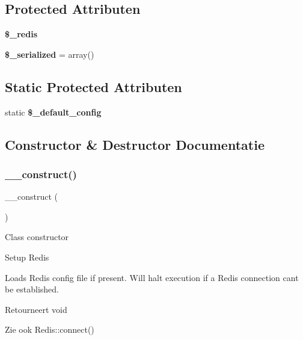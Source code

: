 \subsection*{Protected Attributen}
\begin{DoxyCompactItemize}
\item 
\mbox{\label{class_c_i___cache__redis_a36de60a8fcbe3efac91a87577d0728de}} 
{\bfseries \$\+\_\+redis}
\item 
\mbox{\label{class_c_i___cache__redis_a138ded30ad61d04611681cdf7060a6cf}} 
{\bfseries \$\+\_\+serialized} = array()
\end{DoxyCompactItemize}
\subsection*{Static Protected Attributen}
\begin{DoxyCompactItemize}
\item 
static {\bfseries \$\+\_\+default\+\_\+config}
\end{DoxyCompactItemize}


\subsection{Constructor \& Destructor Documentatie}
\mbox{\label{class_c_i___cache__redis_a095c5d389db211932136b53f25f39685}} 
\subsubsection{\texorpdfstring{\_\_construct()}{\_\_construct()}}
{\footnotesize\ttfamily \+\_\+\+\_\+construct (\begin{DoxyParamCaption}{ }\end{DoxyParamCaption})}

Class constructor

Setup Redis

Loads Redis config file if present. Will halt execution if a Redis connection can\textquotesingle{}t be established.

\begin{DoxyReturn}{Retourneert}
void 
\end{DoxyReturn}
\begin{DoxySeeAlso}{Zie ook}
Redis\+::connect() 
\end{DoxySeeAlso}
\mbox{\label{class_c_i___cache__redis_a421831a265621325e1fdd19aace0c758}} 
